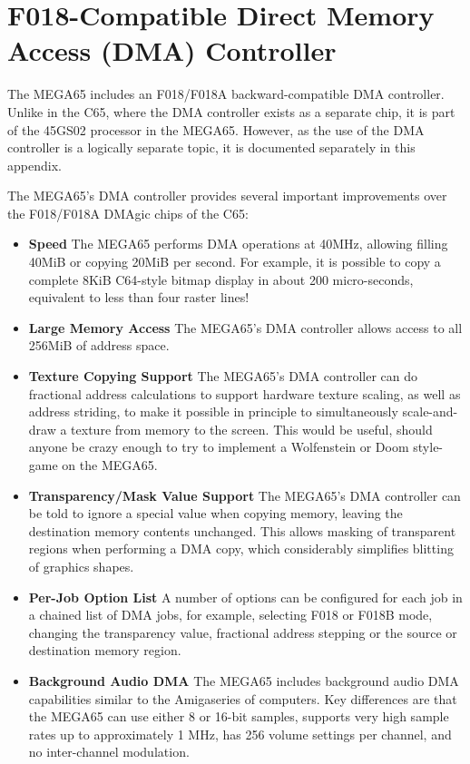 \chapter{F018-Compatible Direct Memory Access (DMA) Controller}
\label{cha:dmagic}

The MEGA65 includes an F018/F018A backward-compatible DMA controller.
Unlike in the C65, where the DMA controller exists as a separate
chip, it is part of the 45GS02 processor in the MEGA65.  However, as the
use of the DMA controller is a logically separate topic, it is documented
separately in this appendix.

The MEGA65's DMA controller provides several important improvements over the
F018/F018A DMAgic chips of the C65:

\begin{itemize}
\item{\bf Speed} The MEGA65 performs DMA operations at 40MHz, allowing filling 40MiB or copying 20MiB
  per second.  For example, it is possible to copy a complete 8KiB C64-style bitmap display in
  about 200 micro-seconds, equivalent to less than four raster lines!
 \item{\bf Large Memory Access} The MEGA65's DMA controller allows access to all 256MiB of address space.
\item{\bf Texture Copying Support} The MEGA65's DMA controller can do fractional address calculations
  to support hardware texture scaling, as well as address striding, to make it possible in principle
  to simultaneously scale-and-draw a texture from memory to the screen. This would be useful, should
  anyone be crazy enough to try to implement a Wolfenstein or Doom style-game on the MEGA65.
\item{\bf Transparency/Mask Value Support} The MEGA65's DMA controller can be told to ignore a special value
   when copying memory, leaving the destination memory contents unchanged. This allows masking of transparent
   regions when performing a DMA copy, which considerably simplifies blitting of graphics shapes.
\item{\bf Per-Job Option List} A number of options can be configured for each job in a chained list of DMA
  jobs, for example, selecting F018 or F018B mode, changing the transparency value, fractional address stepping
  or the source or destination memory region.

\item{\bf Background Audio DMA}
  The MEGA65 includes background audio DMA capabilities similar to the Amiga\texttrademark series of computers.
  Key differences are that the MEGA65 can use either 8 or 16-bit samples, supports very high sample rates
  up to approximately 1 MHz, has 256 volume settings per channel, and no inter-channel modulation.

\end{itemize}


